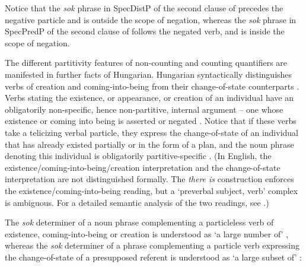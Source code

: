 \documentclass[output=paper]{langscibook}
\begin{document}
\noindent Notice that the \textit{sok} phrase in SpecDistP of the second clause of  precedes the negative particle and is outside the scope of negation, whereas the \textit{sok} phrase in SpecPredP of the second clause of  follows the negated verb, and is inside the scope of negation.

The different partitivity features of non-counting and counting quantifiers are manifested in further facts of Hungarian. Hungarian syntactically distinguishes verbs of creation and coming-into-being from their change-of-state counterparts \citep{szabolcsi1986definiteness,pinon08}. Verbs stating the existence, or appearance, or creation of an individual have an obligatorily non-specific, hence non-partitive, internal argument – one whose existence or coming into being is asserted or nega\-ted . Notice that if these verbs take a telicizing verbal particle, they express the change-of-state of an individual that has already existed partially or in the form of a plan, and the noun phrase denoting this individual is obligatorily partitive-specific . (In English, the existence/coming-into-being/creation interpretation and the change-of-state interpretation are not distinguished formally. The \textit{there is} construction enforces the existence/coming-into-being reading, but a ‘preverbal subject, verb’ complex is ambiguous. For a detailed semantic analysis of the two readings, see \citealt{pinon08}.)  

\eal
{}
\zl

\noindent The \textit{sok} determiner of a noun phrase complementing a particleless verb of existence, coming-into-being or creation is understood as `a large number of' , whereas the \textit{sok} determiner of a phrase complementing a particle verb expressing the change-of-state of a presupposed referent is understood as `a large subset of' :
\end{document}
